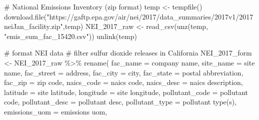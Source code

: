 \documentclass[
  letterpaper,
  DIV=11,
  numbers=noendperiod]{scrartcl}
\newenvironment{Shaded}{\begin{snugshade}}{\end{snugshade}}
\newcommand{\AttributeTok}[1]{\textcolor[rgb]{0.40,0.45,0.13}{#1}}
\newcommand{\CommentTok}[1]{\textcolor[rgb]{0.37,0.37,0.37}{#1}}
\newcommand{\FunctionTok}[1]{\textcolor[rgb]{0.28,0.35,0.67}{#1}}
\newcommand{\NormalTok}[1]{\textcolor[rgb]{0.00,0.23,0.31}{#1}}
\newcommand{\OtherTok}[1]{\textcolor[rgb]{0.00,0.23,0.31}{#1}}
\newcommand{\SpecialCharTok}[1]{\textcolor[rgb]{0.37,0.37,0.37}{#1}}
\newcommand{\StringTok}[1]{\textcolor[rgb]{0.13,0.47,0.30}{#1}}
\begin{document}
\begin{Shaded}
\begin{Highlighting}[]
\CommentTok{\# National Emissions Inventory (zip format)}
\NormalTok{temp }\OtherTok{\textless{}{-}} \FunctionTok{tempfile}\NormalTok{()}
\FunctionTok{download.file}\NormalTok{(}\StringTok{"https://gaftp.epa.gov/air/nei/2017/data\_summaries/2017v1/2017neiJan\_facility.zip"}\NormalTok{,temp)}
\NormalTok{NEI\_2017\_raw }\OtherTok{\textless{}{-}} \FunctionTok{read\_csv}\NormalTok{(}\FunctionTok{unz}\NormalTok{(temp, }\StringTok{"emis\_sum\_fac\_15420.csv"}\NormalTok{))}
\FunctionTok{unlink}\NormalTok{(temp)}

\CommentTok{\# format NEI data}
\CommentTok{\# filter sulfur dioxide releases in California}
\NormalTok{NEI\_2017\_form }\OtherTok{\textless{}{-}}\NormalTok{ NEI\_2017\_raw }\SpecialCharTok{\%\textgreater{}\%}
  \FunctionTok{rename}\NormalTok{(}
    \AttributeTok{fac\_name =} \StringTok{\textasciigrave{}}\AttributeTok{company name}\StringTok{\textasciigrave{}}\NormalTok{,}
    \AttributeTok{site\_name =} \StringTok{\textasciigrave{}}\AttributeTok{site name}\StringTok{\textasciigrave{}}\NormalTok{,}
    \AttributeTok{fac\_street =}\NormalTok{ address,}
    \AttributeTok{fac\_city =}\NormalTok{ city,}
    \AttributeTok{fac\_state =} \StringTok{\textasciigrave{}}\AttributeTok{postal abbreviation}\StringTok{\textasciigrave{}}\NormalTok{,}
    \AttributeTok{fac\_zip =} \StringTok{\textasciigrave{}}\AttributeTok{zip code}\StringTok{\textasciigrave{}}\NormalTok{,}
    \AttributeTok{naics\_code =} \StringTok{\textasciigrave{}}\AttributeTok{naics code}\StringTok{\textasciigrave{}}\NormalTok{,}
    \AttributeTok{naics\_desc =} \StringTok{\textasciigrave{}}\AttributeTok{naics description}\StringTok{\textasciigrave{}}\NormalTok{,}
    \AttributeTok{latitude =} \StringTok{\textasciigrave{}}\AttributeTok{site latitude}\StringTok{\textasciigrave{}}\NormalTok{,}
    \AttributeTok{longitude =} \StringTok{\textasciigrave{}}\AttributeTok{site longitude}\StringTok{\textasciigrave{}}\NormalTok{,}
    \AttributeTok{pollutant\_code =} \StringTok{\textasciigrave{}}\AttributeTok{pollutant code}\StringTok{\textasciigrave{}}\NormalTok{,}
    \AttributeTok{pollutant\_desc =} \StringTok{\textasciigrave{}}\AttributeTok{pollutant desc}\StringTok{\textasciigrave{}}\NormalTok{,}
    \AttributeTok{pollutant\_type =} \StringTok{\textasciigrave{}}\AttributeTok{pollutant type(s)}\StringTok{\textasciigrave{}}\NormalTok{,}
    \AttributeTok{emissions\_uom =} \StringTok{\textasciigrave{}}\AttributeTok{emissions uom}\StringTok{\textasciigrave{}}\NormalTok{,}

\end{Highlighting}
\end{Shaded}
\end{document}
